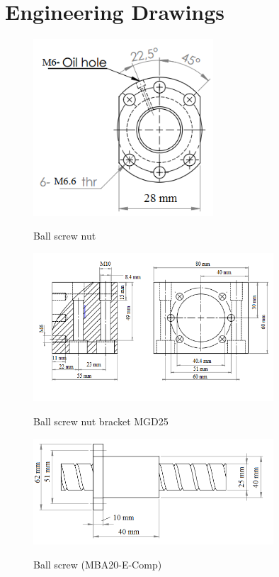 
\appendix
\section{Engineering Drawings} \label{App:AppendixA}

\begin{figure} [H]
\centering
\includegraphics[width=0.6\textwidth]{figures/MechBS1}
\caption{Ball screw nut} \cite{aluflex}
\label{fig:MechBS1}
\end{figure}

\begin{figure} [H]
\centering
\includegraphics[width=0.8\textwidth]{figures/MechBS3}
\caption{Ball screw nut bracket MGD25} \cite{aluflex}
\label{fig:MechBS2}
\end{figure}


\begin{figure} [H]
\centering
\includegraphics[width=0.8\textwidth]{figures/MechBS2}
\caption{Ball screw (MBA20-E-Comp)} \cite{aluflex}
\label{fig:MechBS2}
\end{figure}



